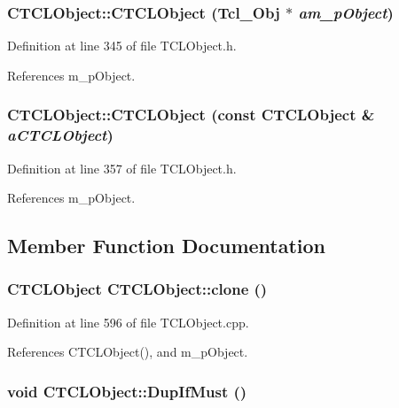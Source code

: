 \subsubsection{\setlength{\rightskip}{0pt plus 5cm}CTCLObject::CTCLObject (Tcl\_\-Obj $\ast$ {\em am\_\-p\-Object})\hspace{0.3cm}{\tt  [inline]}}\label{classCTCLObject_a2}




Definition at line 345 of file TCLObject.h.

References m\_\-p\-Object.
\subsubsection{\setlength{\rightskip}{0pt plus 5cm}CTCLObject::CTCLObject (const CTCLObject \& {\em a\-CTCLObject})\hspace{0.3cm}{\tt  [inline]}}\label{classCTCLObject_a3}




Definition at line 357 of file TCLObject.h.

References m\_\-p\-Object.

\subsection{Member Function Documentation}
\subsubsection{\setlength{\rightskip}{0pt plus 5cm}CTCLObject CTCLObject::clone ()}\label{classCTCLObject_a21}




Definition at line 596 of file TCLObject.cpp.

References CTCLObject(), and m\_\-p\-Object.
\subsubsection{\setlength{\rightskip}{0pt plus 5cm}void CTCLObject::Dup\-If\-Must ()\hspace{0.3cm}{\tt  [inline, protected]}}\label{classCTCLObject_b1}




